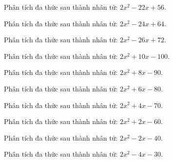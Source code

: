 \begin{bt}
	Phân tích đa thức sau thành nhân tử: $2 x^2 - 22 x + 56$.
\end{bt}
\begin{bt}
	Phân tích đa thức sau thành nhân tử: $2 x^2 - 24 x + 64$.
\end{bt}
\begin{bt}
	Phân tích đa thức sau thành nhân tử: $2 x^2 - 26 x + 72$.
\end{bt}
\begin{bt}
	Phân tích đa thức sau thành nhân tử: $2 x^2 + 10 x - 100$.
\end{bt}
\begin{bt}
	Phân tích đa thức sau thành nhân tử: $2 x^2 + 8 x - 90$.
\end{bt}
\begin{bt}
	Phân tích đa thức sau thành nhân tử: $2 x^2 + 6 x - 80$.
\end{bt}
\begin{bt}
	Phân tích đa thức sau thành nhân tử: $2 x^2 + 4 x - 70$.
\end{bt}
\begin{bt}
	Phân tích đa thức sau thành nhân tử: $2 x^2 + 2 x - 60$.
\end{bt}
\begin{bt}
	Phân tích đa thức sau thành nhân tử: $2 x^2 - 2 x - 40$.
\end{bt}
\begin{bt}
	Phân tích đa thức sau thành nhân tử: $2 x^2 - 4 x - 30$.
\end{bt}
